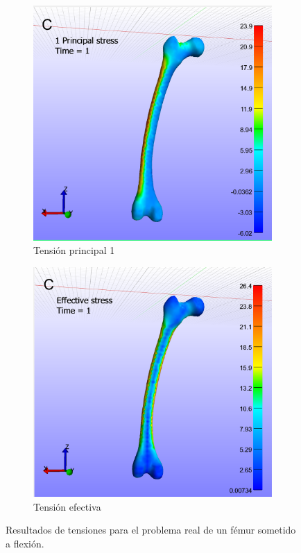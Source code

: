 \begin{figure}[!htp]
\centering
\begin{subfigure}[b]{0.44\textwidth}
\centering
\includegraphics[width=\textwidth]{figuras_2/femur5.png}
\caption{Tensión principal 1}
\label{fig:femur5}
\end{subfigure}
\begin{subfigure}[b]{0.45\textwidth}
\centering
\includegraphics[width=\textwidth]{figuras_2/femur6.png}
\caption{Tensión efectiva}
\label{fig:femur6}
\end{subfigure}
\caption{Resultados de tensiones para el problema real de un fémur sometido a flexión.}
\label{fig:femur-05-06}
\end{figure}


